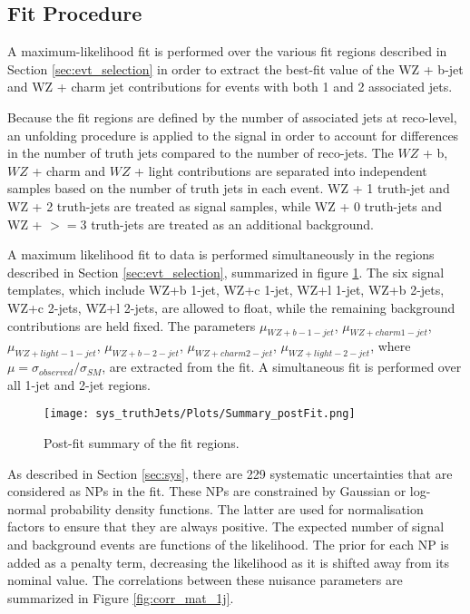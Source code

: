 
\subsection{Fit Procedure}
\label{sec:fit}

A maximum-likelihood fit is performed over the various fit regions described in Section \ref{sec:evt_selection} in order to extract the best-fit value of the WZ + b-jet and WZ + charm jet contributions for events with both 1 and 2 associated jets.

Because the fit regions are defined by the number of associated jets at reco-level, an unfolding procedure is applied to the signal in order to account for differences in the number of truth jets compared to the number of reco-jets. The $WZ$ + b, $WZ$ + charm and $WZ$ + light contributions are separated into independent samples based on the number of truth jets in each event. WZ + 1 truth-jet and WZ + 2 truth-jets are treated as signal samples, while WZ + 0 truth-jets and WZ + $>=$3 truth-jets are treated as an additional background. 

A maximum likelihood fit to data is performed simultaneously in the regions described in Section \ref{sec:evt_selection}, summarized in figure \ref{fig:summary}. The six signal templates, which include WZ+b 1-jet, WZ+c 1-jet, WZ+l 1-jet, WZ+b 2-jets, WZ+c 2-jets, WZ+l 2-jets, are allowed to float, while the remaining background contributions are held fixed. The parameters $\mu_{WZ+b - 1-jet}$, $\mu_{WZ+charm 1-jet}$, $\mu_{WZ+light - 1-jet}$, $\mu_{WZ+b - 2-jet}$, $\mu_{WZ+charm 2-jet}$, $\mu_{WZ+light - 2-jet}$, where $\mu = \sigma_{observed}/\sigma_{SM} $, are extracted from the fit. A simultaneous fit is performed over all 1-jet and 2-jet regions.

\begin{figure}[H]
  \center                                                                                                                    
  \texttt{[image: sys\_truthJets/Plots/Summary\_postFit.png]}
  \caption{Post-fit summary of the fit regions.}
  \label{fig:summary}
\end{figure}

As described in Section \ref{sec:sys}, there are 229 systematic uncertainties that are considered as NPs in the fit. These NPs are constrained by Gaussian or log-normal probability density functions. The latter are used for normalisation factors to ensure that they are always positive. The expected number of signal and background events are functions of the likelihood. The prior for each NP is added as a penalty term, decreasing the likelihood as it is shifted away from its nominal value. The correlations between these nuisance parameters are summarized in Figure \ref{fig:corr_mat_1j}. 

